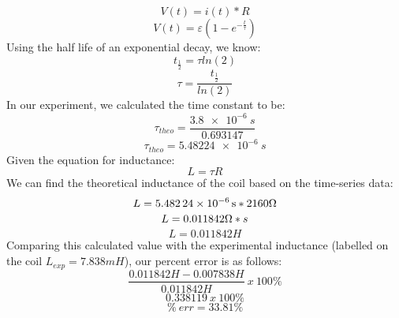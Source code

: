 \documentclass[../Lab.tex]{subfiles}
\begin{document}
\begin{equation}
    V(t) = i(t) * R
\end{equation}
\begin{equation}
    V(t) = \varepsilon(1-e^{-\frac{t}{\tau}})
\end{equation}
Using the half life of an exponential decay, we know:
\begin{equation}
     t_{\frac{1}{2}} = \tau{ln(2)}
\end{equation}
\begin{equation}
    \tau = \frac{t_{\frac{1}{2}}}{ln(2)}
\end{equation}
In our experiment, we calculated the time constant to be:
\begin{equation}
    \tau_{theo} = \frac{\SI{3.8e-6}{s}}{0.693147}
\end{equation}
\begin{equation}
    \tau_{theo} = \SI{5.48224e-6}{s}
\end{equation}
Given the equation for inductance:
\begin{equation}
    L=\tau{R}
\end{equation}
We can find the theoretical inductance of the coil based on the time-series data:
\begin{equation}
    L = \SI{5.48224e-6}{s} * 2160\ohm
\end{equation}
\begin{equation}
    L = 0.011842 \ohm*s
\end{equation}
\begin{equation}
    L = 0.011842H
\end{equation}
Comparing this calculated value with the experimental inductance (labelled on the coil $L_{exp} = 7.838mH$), our percent error is as follows:
\begin{equation}
    \frac{0.011842H - 0.007838H}{0.011842H}\ x\ 100\%
\end{equation}
\begin{equation}
    0.338119\ x\ 100\%
\end{equation}
\begin{equation}
    \%\ err = 33.81\%
\end{equation}
\end{document}
